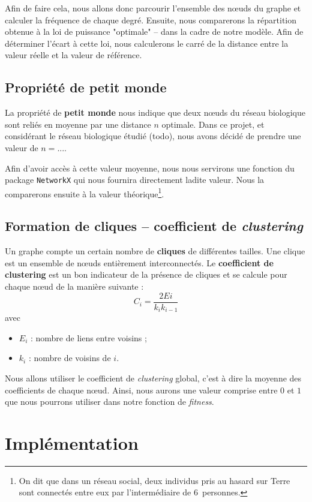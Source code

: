 Afin de faire cela, nous allons donc parcourir l'ensemble des nœuds du graphe et calculer la fréquence de chaque degré. Ensuite, nous comparerons la répartition obtenue à la loi de puissance "optimale" -- dans la cadre de notre modèle. Afin de déterminer l'écart à cette loi, nous calculerons le carré de la distance entre la valeur réelle et la valeur de référence.

\subsection{Propriété de petit monde}
La propriété de \textbf{petit monde} nous indique que deux nœuds du réseau biologique sont reliés en moyenne par une distance $n$ optimale. Dans ce projet, et considérant le réseau biologique étudié (todo), nous avons décidé de prendre une valeur de $n=...$.

Afin d'avoir accès à cette valeur moyenne, nous nous servirons une fonction du package \verb?NetworkX? qui nous fournira directement ladite valeur. Nous la comparerons ensuite à la valeur théorique\footnote{On dit que dans un réseau social, deux individus pris au hasard sur Terre sont connectés entre eux par l'intermédiaire de $6$~personnes.}.

\subsection{Formation de cliques -- coefficient de \textit{clustering}}
Un graphe compte un certain nombre de \textbf{cliques} de différentes tailles. Une clique est un ensemble de nœuds entièrement interconnectés. Le \textbf{coefficient de clustering} est un bon indicateur de la présence de cliques et se calcule pour chaque nœud de la manière suivante :
$$ C_i = \frac{2Ei}{k_i k_{i-1}} $$
avec
\begin{itemize}
 \item $E_i$ : nombre de liens entre voisins ;
 \item $k_i$ : nombre de voisins de $i$.
\end{itemize}
Nous allons utiliser le coefficient de \textit{clustering} global, c'est à dire la moyenne des coefficients de chaque nœud. Ainsi, nous aurons une valeur comprise entre $0$ et $1$ que nous pourrons utiliser dans notre fonction de \textit{fitness}.



\section{Implémentation}

